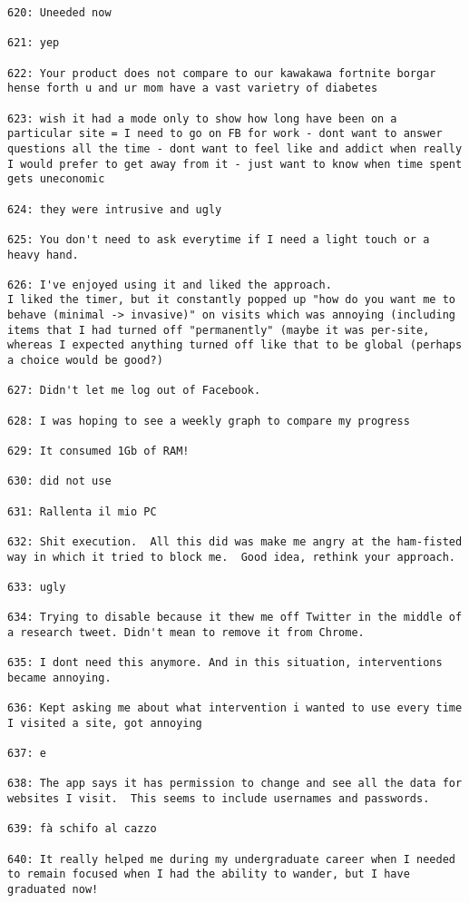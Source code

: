 \begin{lstlisting}[breaklines]
620: Uneeded now

621: yep

622: Your product does not compare to our kawakawa fortnite borgar hense forth u and ur mom have a vast varietry of diabetes

623: wish it had a mode only to show how long have been on a particular site = I need to go on FB for work - dont want to answer questions all the time - dont want to feel like and addict when really I would prefer to get away from it - just want to know when time spent gets uneconomic

624: they were intrusive and ugly

625: You don't need to ask everytime if I need a light touch or a heavy hand.

626: I've enjoyed using it and liked the approach. 
I liked the timer, but it constantly popped up "how do you want me to behave (minimal -> invasive)" on visits which was annoying (including items that I had turned off "permanently" (maybe it was per-site, whereas I expected anything turned off like that to be global (perhaps a choice would be good?)

627: Didn't let me log out of Facebook.

628: I was hoping to see a weekly graph to compare my progress

629: It consumed 1Gb of RAM!

630: did not use

631: Rallenta il mio PC

632: Shit execution.  All this did was make me angry at the ham-fisted way in which it tried to block me.  Good idea, rethink your approach.

633: ugly

634: Trying to disable because it thew me off Twitter in the middle of a research tweet. Didn't mean to remove it from Chrome.

635: I dont need this anymore. And in this situation, interventions became annoying.

636: Kept asking me about what intervention i wanted to use every time I visited a site, got annoying

637: e

638: The app says it has permission to change and see all the data for websites I visit.  This seems to include usernames and passwords.

639: fà schifo al cazzo

640: It really helped me during my undergraduate career when I needed to remain focused when I had the ability to wander, but I have graduated now!


\end{lstlisting}
